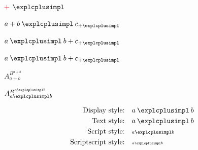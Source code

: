 \documentclass{article}
\begin{document}
\makebox[0pt][l]{$\explcplus$}\textcolor{red}{$+$}\quad
\makebox[0pt][l]{\textcolor{red}{$+$}}$\explcplus$

$a+b\explcplus c_{+\explcplus}$

$a\explcplus b+c_{+\explcplus}$

\medskip

{\LARGE$a\explcplus b+c_{+\explcplus}$}

\medskip 

$A_{a+b}^{B^{a+b}}$

$A_{a\explcplus b}^{B^{a\explcplus b}}$

\medskip 

\begin{align*}
  \text{Display style:}      &\quad a \explcplus b \\
  \text{Text style:}         &\quad \textstyle a \explcplus b \\
  \text{Script style:}       &\quad \scriptstyle a \explcplus b \\
  \text{Scriptscript style:} &\quad \scriptscriptstyle a \explcplus b
\end{align*}

\setlength{\fboxsep}{-0.1pt}%
\setlength{\fboxrule}{0.1pt}%
\fbox{$+$}\fbox{$\explcplus$}

\medskip 

\fbox{$\explcplus$}\fbox{$+$}
\end{document}
